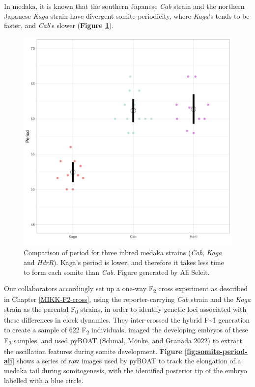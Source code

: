 \documentclass[
]{book}
\begin{document}
In medaka, it is known that the southern Japanese \emph{Cab} strain and the northern Japanese \emph{Kaga} strain have divergent somite periodicity, where \emph{Kaga}'s tends to be faster, and \emph{Cab}'s slower (\textbf{Figure \ref{fig:F0-Cab-Kaga-HdrR}}).



\begin{figure}

{\centering \includegraphics[width=0.5\linewidth]{figs/somites/ali_period_F0_Cab_Kaga} 

}

\caption{Comparison of period for three inbred medaka strains (\emph{Cab}, \emph{Kaga} and \emph{HdrR}). Kaga's period is lower, and therefore it takes less time to form each somite than \emph{Cab}. Figure generated by Ali Seleit.}\label{fig:F0-Cab-Kaga-HdrR}
\end{figure}

Our collaborators accordingly set up a one-way F\textsubscript{2} cross experiment as described in Chapter \ref{MIKK-F2-cross}, using the reporter-carrying \emph{Cab} strain and the \emph{Kaga} strain as the parental F\textsubscript{0} strains, in order to identify genetic loci associated with these differences in clock dynamics. They inter-crossed the hybrid F\textasciitilde1 generation to create a sample of 622 F\textsubscript{2} individuals, imaged the developing embryos of these F\textsubscript{2} samples, and used pyBOAT (Schmal, Mönke, and Granada 2022) to extract the oscillation features during somite development. \textbf{Figure \ref{fig:somite-period-ali}} shows a series of raw images used by pyBOAT to track the elongation of a medaka tail during somitogenesis, with the identified posterior tip of the embryo labelled with a blue circle.
\end{document}
